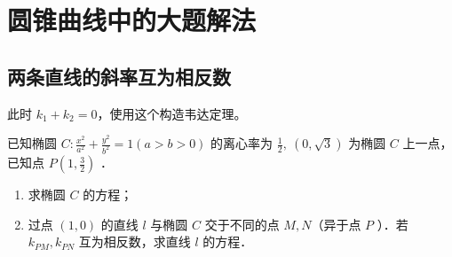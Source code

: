 \section{圆锥曲线中的大题解法}

\subsection{两条直线的斜率互为相反数}

\begin{theorem}
    此时 $k_1 + k_2 = 0$，使用这个构造韦达定理。
\end{theorem}

\begin{example}
    已知椭圆 $C: \frac{x^2}{a^2}+\frac{y^2}{b^2}=1(a>b>0)$ 的离心率为 $\frac{1}{2}, ~(0, \sqrt{3})$ 为椭圆 $C$ 上一点，已知点 $P\left(1, \frac{3}{2}\right)$ ．
    \begin{enumerate}
        \item 求椭圆 $C$ 的方程；
        \item 过点 $(1,0)$ 的直线 $l$ 与椭圆 $C$ 交于不同的点 $M, N$（异于点 $P$ ）．若$k_{P M},k_{P N}$ 互为相反数，求直线 $l$ 的方程．
    \end{enumerate}
\end{example}